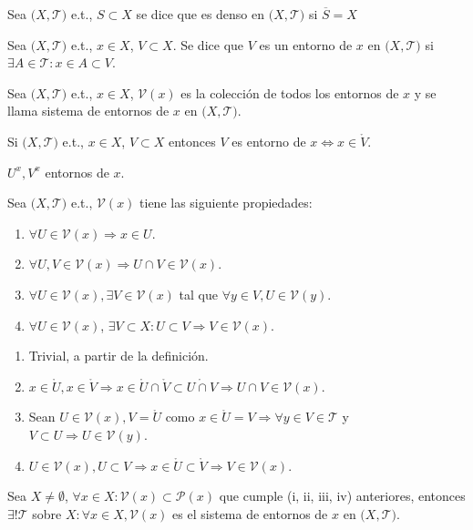 \begin{defn}
  Sea $\big( X, \mathcal{T} \big)$ e.t., $S \subset X$ se dice que es denso en $\big( X, \mathcal{T} \big)$ si $\overline{S} = X$
\end{defn}

\begin{defn}
  Sea $\big( X, \mathcal{T} \big)$ e.t., $x \in X$, $V \subset X$. Se dice que $V$ es un entorno de $x$ en $\big( X, \mathcal{T} \big)$ si $\exists A \in \mathcal{T}: x \in A \subset V$.
\end{defn}

\begin{defn}
  Sea $\big( X, \mathcal{T} \big)$ e.t., $x \in X$, $\mathcal{V}(x)$ es la colección de todos los entornos de $x$ y se llama sistema de entornos de $x$ en $\big( X, \mathcal{T} \big)$.
\end{defn}

\begin{obs}
  Si $\big( X, \mathcal{T} \big)$ e.t., $x \in X$, $V \subset X$ entonces $V$ es entorno de $x \Leftrightarrow x \in \mathring{V}$.
\end{obs}

\begin{nota}
  $U^{x}, V^{x}$ entornos de $x$.
\end{nota}

\begin{prop}
  Sea $\big( X, \mathcal{T} \big)$ e.t., $\mathcal{V}(x)$ tiene las siguiente propiedades:
  \begin{enumerate}[label=(\roman*)]
    \item $\forall U \in \mathcal{V}(x) \Rightarrow x \in U$.
    \item $\forall U,V \in \mathcal{V}(x) \Rightarrow U \cap V \in \mathcal{V}(x)$.
    \item $\forall U \in \mathcal{V}(x), \exists V \in \mathcal{V}(x)$ tal que $\forall y \in V, U \in \mathcal{V}(y)$.
    \item $\forall U \in \mathcal{V}(x)$, $ \exists V \subset X: U \subset V \Rightarrow V \in \mathcal{V}(x)$.
  \end{enumerate}
\end{prop}

\begin{dem}
  \begin{enumerate}[label=(\roman*)]
    \item Trivial, a partir de la definición.
    \item $x \in \mathring{U}, x \in \mathring{V} \Rightarrow x \in \mathring{U} \cap \mathring{V} \subset \mathring{U \cap V} \Rightarrow U \cap V \in \mathcal{V}(x)$.
    \item Sean $ U \in \mathcal{V}(x), V = \mathring{U}$ como $x \in \mathring{U} = V \Rightarrow \forall y \in V \in \mathcal{T}$ y $V \subset U \Rightarrow U \in \mathcal{V}(y)$.
    \item $U \in \mathcal{V}(x), U \subset V \Rightarrow x \in \mathring{U} \subset \mathring{V} \Rightarrow V \in \mathcal{V}(x)$.
  \end{enumerate}
\end{dem}

\begin{prop}
  Sea $X \neq \emptyset$, $ \forall x \in X: \mathcal{V}(x)  \subset \mathcal{P}(x)$ que cumple (i, ii, iii, iv) anteriores, entonces $\exists! \mathcal{T}$ sobre $ X: \forall x \in X, \mathcal{V}(x)$ es el sistema de entornos de $x$ en $\big( X, \mathcal{T} \big)$.
\end{prop}
